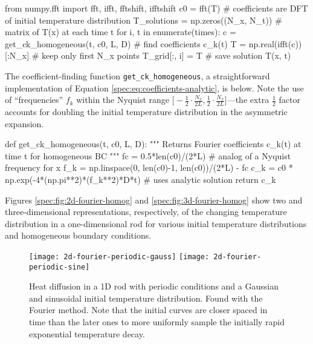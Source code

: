 \documentclass[11pt, a4paper]{article}
\begin{document}
\begin{python}
from numpy.fft import fft, ifft, fftshift, ifftshift
c0 = fft(T)  # coefficients are DFT of initial temperature distribution
T_solutions = np.zeros((N_x, N_t))       # matrix of T(x) at each time t
for i, t in enumerate(times): 
    c = get_ck_homogeneous(t, c0, L, D)  # find coefficients c_k(t)
    T = np.real(ifft(c))[:N_x]           # keep only first N_x points
    T_grid[:, i] = T                     # save solution T(x, t)
\end{python}
The coefficient-finding function \texttt{get\_ck\_homogeneous}, a straightforward implementation of Equation \ref{spec:eq:coefficients-analytic}, is below. Note the use of ``frequencies'' $ f_{k} $ within the Nyquist range $ \big[-\frac{1}{2}\cdot\frac{N_{x}}{2L}, \frac{1}{2}\cdot\frac{N_{x}}{2L}\big] $---the extra $ \frac{1}{2}$ factor accounts for doubling the initial temperature distribution in the asymmetric expansion.
\begin{python}
def get_ck_homogeneous(t, c0, L, D):
    """ Returns Fourier coefficients c_k(t) at time t for homogeneous BC """
    fc = 0.5*len(c0)/(2*L)  # analog of a Nyquist frequency for x
    f_k = np.linspace(0, len(c0)-1, len(c0))/(2*L) - fc
    c_k = c0 * np.exp(-4*(np.pi**2)*(f_k**2)*D*t)  # uses analytic solution
    return c_k
\end{python}
Figures \ref{spec:fig:2d-fourier-homog} and  \ref{spec:fig:3d-fourier-homog} show two and three-dimensional representations, respectively, of the changing temperature distribution in a one-dimensional rod for various initial temperature distributions and homogeneous boundary conditions. 



\begin{figure} [htb!]
\centering
\texttt{[image: 2d-fourier-periodic-gauss]} \hfill
\texttt{[image: 2d-fourier-periodic-sine]}
\caption{Heat diffusion in a 1D rod with periodic conditions and a Gaussian and sinusoidal initial temperature distribution. Found with the Fourier method. Note that the initial curves are closer spaced in time than the later ones to more uniformly sample the initially rapid exponential temperature decay.}
\label{spec:fig:2d-fourier-periodic}
\end{figure}
\end{document}
